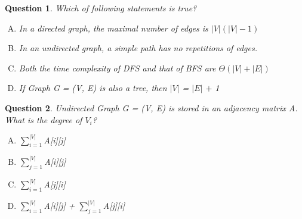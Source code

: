 \documentclass{article}
\newtheorem{Q}{Question}
\begin{document}
\begin{Q}
Which of following statements is true?
\begin{enumerate}[(A)]
	\item In a directed graph, the maximal number of edges is $|V|(|V|-1)$ 
	\item In an undirected graph, a simple path has no repetitions of edges.
	\item Both the time complexity of DFS and that of BFS are $\Theta(|V|+|E|)$ 
	\item If Graph G = (V, E) is also a tree, then $|V|$ = $|E|$ $+$ 1
\end{enumerate} 
\end{Q}


\begin{Q}
Undirected Graph G = (V, E) is stored in an adjacency matrix A. What is the degree of $V_i$?
\begin{enumerate}[(A)]
	\item $\sum_{i=1}^{|V|}$A[i][j]
	\item $\sum_{j=1}^{|V|}$A[i][j]
	\item $\sum_{i=1}^{|V|}$A[j][i]
	\item $\sum_{i=1}^{|V|}$A[i][j] + $\sum_{j=1}^{|V|}$A[j][i]
\end{enumerate}
\end{Q}
\end{document}

